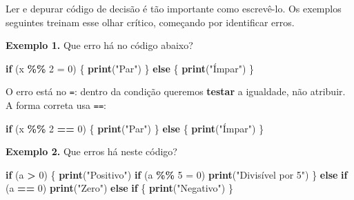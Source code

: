 \documentclass[
  portuguese,
  11pt,
  openany]{book}
\newenvironment{Shaded}{\begin{snugshade}}{\end{snugshade}}
\newcommand{\ControlFlowTok}[1]{\textcolor[rgb]{0.13,0.29,0.53}{\textbf{#1}}}
\newcommand{\DecValTok}[1]{\textcolor[rgb]{0.00,0.00,0.81}{#1}}
\newcommand{\FunctionTok}[1]{\textcolor[rgb]{0.13,0.29,0.53}{\textbf{#1}}}
\newcommand{\NormalTok}[1]{#1}
\newcommand{\OtherTok}[1]{\textcolor[rgb]{0.56,0.35,0.01}{#1}}
\newcommand{\SpecialCharTok}[1]{\textcolor[rgb]{0.81,0.36,0.00}{\textbf{#1}}}
\newcommand{\StringTok}[1]{\textcolor[rgb]{0.31,0.60,0.02}{#1}}
\begin{document}
Ler e depurar código de decisão é tão importante como escrevê-lo. Os exemplos
seguintes treinam esse olhar crítico, começando por identificar erros.

\textbf{Exemplo 1.} Que erro há no código abaixo?

\begin{Shaded}
\begin{Highlighting}[]
\ControlFlowTok{if}\NormalTok{ (x }\SpecialCharTok{\%\%} \DecValTok{2} \OtherTok{=} \DecValTok{0}\NormalTok{) \{}
  \FunctionTok{print}\NormalTok{(}\StringTok{"Par"}\NormalTok{)}
\NormalTok{\} }\ControlFlowTok{else}\NormalTok{ \{}
  \FunctionTok{print}\NormalTok{(}\StringTok{"Ímpar"}\NormalTok{)}
\NormalTok{\}}
\end{Highlighting}
\end{Shaded}

O erro está no \texttt{=}: dentro da condição queremos \textbf{testar} a igualdade, não
atribuir. A forma correta usa \texttt{==}:

\begin{Shaded}
\begin{Highlighting}[]
\ControlFlowTok{if}\NormalTok{ (x }\SpecialCharTok{\%\%} \DecValTok{2} \SpecialCharTok{==} \DecValTok{0}\NormalTok{) \{}
  \FunctionTok{print}\NormalTok{(}\StringTok{"Par"}\NormalTok{)}
\NormalTok{\} }\ControlFlowTok{else}\NormalTok{ \{}
  \FunctionTok{print}\NormalTok{(}\StringTok{"Ímpar"}\NormalTok{)}
\NormalTok{\}}
\end{Highlighting}
\end{Shaded}

\textbf{Exemplo 2.} Que erros há neste código?

\begin{Shaded}
\begin{Highlighting}[]
\ControlFlowTok{if}\NormalTok{ (a }\SpecialCharTok{\textgreater{}} \DecValTok{0}\NormalTok{) \{}
  \FunctionTok{print}\NormalTok{(}\StringTok{"Positivo"}\NormalTok{)}
  \ControlFlowTok{if}\NormalTok{ (a }\SpecialCharTok{\%\%} \DecValTok{5} \OtherTok{=} \DecValTok{0}\NormalTok{)}
    \FunctionTok{print}\NormalTok{(}\StringTok{"Divisível por 5"}\NormalTok{)}
\NormalTok{\} }\ControlFlowTok{else} \ControlFlowTok{if}\NormalTok{ (a }\SpecialCharTok{==} \DecValTok{0}\NormalTok{)}
    \FunctionTok{print}\NormalTok{(}\StringTok{"Zero"}\NormalTok{)}
  \ControlFlowTok{else} \ControlFlowTok{if}\NormalTok{ \{}
    \FunctionTok{print}\NormalTok{(}\StringTok{"Negativo"}\NormalTok{)}
\NormalTok{\}}
\end{Highlighting}
\end{Shaded}
\end{document}

